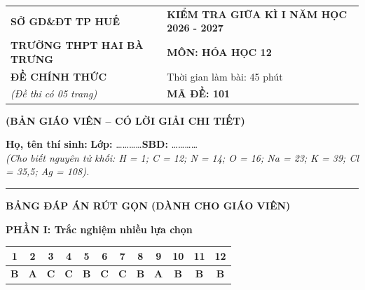 \documentclass[11pt,a4paper]{article}
\begin{document}
\begin{table}[h!]
\centering
\begin{tabularx}{\textwidth}{@{}p{8.5cm}X@{}}
\textbf{SỞ GD\&ĐT TP HUẾ} & \textbf{KIỂM TRA GIỮA KÌ I NĂM HỌC 2026 - 2027} \\
\textbf{TRƯỜNG THPT HAI BÀ TRƯNG} & \textbf{MÔN: HÓA HỌC 12} \\
\textbf{ĐỀ CHÍNH THỨC} & Thời gian làm bài: 45 phút \\
\textit{(Đề thi có 05 trang)} & \textbf{MÃ ĐỀ: 101} \\
\end{tabularx}
\end{table}

\begin{center}
\textbf{\large\color{ansRed}(BẢN GIÁO VIÊN -- CÓ LỜI GIẢI CHI TIẾT)}
\end{center}


\noindent\textbf{Họ, tên thí sinh:} \dotfill \textbf{Lớp:} \dots\dots\dots\dots \textbf{SBD:} \dots\dots\dots\dots\\
\textit{(Cho biết nguyên tử khối: H = 1; C = 12; N = 14; O = 16; Na = 23; K = 39; Cl = 35,5; Ag = 108).}
\par\vspace{-2pt}\noindent\textcolor{gray!40}{\rule{\textwidth}{0.5pt}}\par\vspace{2pt}


\begin{center}
\textbf{\color{ansRed}BẢNG ĐÁP ÁN RÚT GỌN (DÀNH CHO GIÁO VIÊN)}
\end{center}
\textbf{\color{mainGreen}PHẦN I: Trắc nghiệm nhiều lựa chọn}
\begin{center}
\small
\begin{tabular}{|c|c|c|c|c|c|c|c|c|c|c|c|}
\hline
\rowcolor{tableGreen}
\textbf{1} & \textbf{2} & \textbf{3} & \textbf{4} & \textbf{5} & \textbf{6} & \textbf{7} & \textbf{8} & \textbf{9} & \textbf{10} & \textbf{11} & \textbf{12} \\
\hline
\textbf{\color{ansRed}B} & \textbf{\color{ansRed}A} & \textbf{\color{ansRed}C} & \textbf{\color{ansRed}C} & \textbf{\color{ansRed}B} & \textbf{\color{ansRed}C} & \textbf{\color{ansRed}C} & \textbf{\color{ansRed}B} & \textbf{\color{ansRed}A} & \textbf{\color{ansRed}B} & \textbf{\color{ansRed}B} & \textbf{\color{ansRed}B} \\
\hline
\end{tabular}
\end{center}
\end{document}
